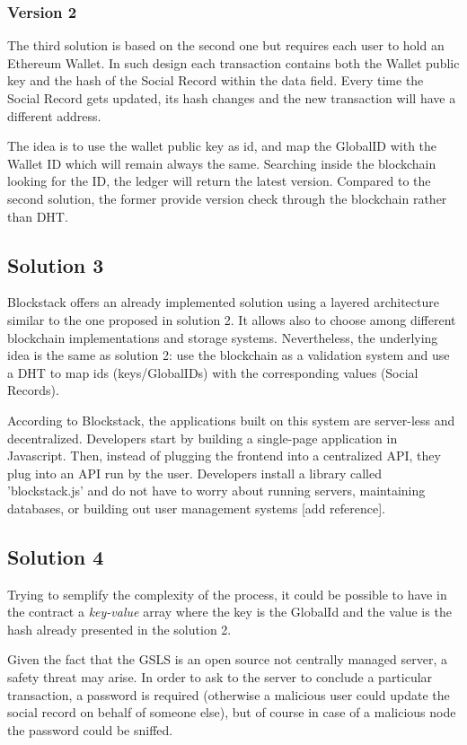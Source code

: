 \subsubsection{Version 2}
The third solution is based on the second one but requires each user to hold an Ethereum Wallet. In such design each transaction contains both the Wallet public key and the hash of the Social Record within the data field. Every time the Social Record gets updated, its hash changes and the new transaction will have a different address.

The idea is to use the wallet public key as id, and map the GlobalID with the Wallet ID which will remain always the same. Searching inside the blockchain looking for the ID, the ledger will return the latest version. Compared to the second solution, the former provide version check through the blockchain rather than DHT.

\subsection{Solution 3}
Blockstack offers an already implemented solution using a layered architecture similar to the one proposed in solution 2. It allows also to choose among different blockchain implementations and storage systems. Nevertheless, the underlying idea is the same as solution 2: use the blockchain as a validation system and use a DHT to map ids (keys/GlobalIDs) with the corresponding values (Social Records).

According to Blockstack, the applications built on this system are server-less and decentralized.
Developers start by building a single-page application in Javascript.
Then, instead of plugging the frontend into a centralized API, they plug into an API run by the user.
Developers install a library called 'blockstack.js' and do not have to worry about running servers, maintaining databases, or building out user management systems [add reference].

\subsection{Solution 4}
Trying to semplify the complexity of the process, it could be possible to have in the contract a \textit{key-value} array where the key is the GlobalId and the value is the hash already presented in the solution 2.

Given the fact that the GSLS is an open source not centrally managed server, a safety threat may arise.
In order to ask to the server to conclude a particular transaction, a password is required (otherwise a malicious user could update the social record on behalf of someone else), but of course in case of a malicious node the password could be sniffed.

